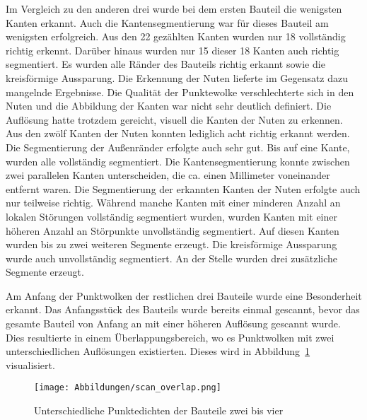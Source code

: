 Im Vergleich zu den anderen drei wurde bei dem ersten Bauteil die wenigsten Kanten erkannt. Auch die Kantensegmentierung war für dieses Bauteil am wenigsten erfolgreich. Aus den 22 gezählten Kanten wurden nur 18 vollständig richtig erkennt. Darüber hinaus wurden nur 15 dieser 18 Kanten auch richtig segmentiert. Es wurden alle Ränder des Bauteils richtig erkannt sowie die kreisförmige Aussparung. Die Erkennung der Nuten lieferte im Gegensatz dazu mangelnde Ergebnisse. Die Qualität der Punktewolke verschlechterte sich in den Nuten und die Abbildung der Kanten war nicht sehr deutlich definiert. Die Auflösung hatte trotzdem gereicht, visuell die Kanten der Nuten zu erkennen. Aus den zwölf Kanten der Nuten konnten lediglich acht richtig erkannt werden. Die Segmentierung der Außenränder erfolgte auch sehr gut. Bis auf eine Kante, wurden alle vollständig segmentiert. Die Kantensegmentierung konnte zwischen zwei parallelen Kanten unterscheiden, die ca. einen Millimeter voneinander entfernt waren. Die Segmentierung der erkannten Kanten der Nuten erfolgte auch nur teilweise richtig. Während manche Kanten mit einer minderen Anzahl an lokalen Störungen vollständig segmentiert wurden, wurden Kanten mit einer höheren Anzahl an Störpunkte unvollständig segmentiert. Auf diesen Kanten wurden bis zu zwei weiteren Segmente erzeugt. Die kreisförmige Aussparung wurde auch unvollständig segmentiert. An der Stelle wurden drei zusätzliche Segmente erzeugt. 

Am Anfang der Punktwolken der restlichen drei Bauteile wurde eine Besonderheit erkannt. Das Anfangsstück des Bauteils wurde bereits einmal gescannt, bevor das gesamte Bauteil von Anfang an mit einer höheren Auflösung gescannt wurde. Dies resultierte in einem Überlappungsbereich, wo es Punktwolken mit zwei unterschiedlichen Auflösungen existierten. Dieses wird in Abbildung~\ref{fig: scan_overlap} visualisiert.

\begin{figure}[h]
	\texttt{[image: Abbildungen/scan\_overlap.png]}
	\centering
	\caption{Unterschiedliche Punktedichten der Bauteile zwei bis vier}
	\label{fig: scan_overlap}
\end{figure}

